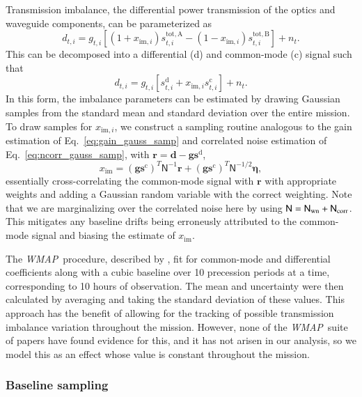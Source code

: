 \documentclass[twocolumn]{../../common/aa}
\def\WMAP{\emph{WMAP}}
\newcommand{\N}[0]{\tens{N}}
\begin{document}
Transmission imbalance, the differential power transmission of the optics and waveguide components, can be parameterized as
\begin{equation}
	d_{t,i}=g_{t,i}[(1+x_{\mathrm{im},i})s_{t,i}^\mathrm{tot,A}-(1-x_{\mathrm{im},i})s_{t,i}^\mathrm{tot,B}]+n_t.
\end{equation}
This can be decomposed into a differential (d) and common-mode (c) signal such that
\begin{equation}
	d_{t,i}=g_{t,i}[s_{t,i}^\mathrm d+x_{\mathrm{im},i}s_{t,i}^\mathrm c]+n_t.
\end{equation}
In this form, the imbalance parameters can be estimated by drawing Gaussian samples from the standard mean and standard deviation over the entire mission. To draw samples for $x_{\mathrm{im},i}$, we construct a sampling routine analogous to the gain estimation of Eq.~\eqref{eq:gain_gauss_samp} and correlated noise estimation of  Eq.~\eqref{eq:ncorr_gauss_samp}, with $\boldsymbol r=\boldsymbol d-\boldsymbol g\boldsymbol s^\mathrm d$,
\begin{equation}
	[(\boldsymbol g\boldsymbol s^\mathrm c)^T\mathsf N^{-1}\boldsymbol g\boldsymbol s^\mathrm c]x_\mathrm{im}
	=(\boldsymbol g\boldsymbol s^\mathrm c)^T\mathsf N^{-1}\boldsymbol r+(\boldsymbol g\boldsymbol s^\mathrm c)^T\mathsf N^{-1/2}\boldsymbol\eta,
\end{equation}
essentially cross-correlating the common-mode signal with $\boldsymbol r$ with appropriate weights and adding a Gaussian random variable with the correct weighting. Note that we are marginalizing over the correlated noise here by using $\N=\N_\mathrm{wn}+\N_\mathrm{corr}$. This mitigates any baseline drifts being erroneusly attributed to the common-mode signal and biasing the estimate of $x_\mathrm{im}$.

The \WMAP\ procedure, described by \citet{jarosik2003a}, fit for common-mode and differential coefficients along with a cubic baseline over 10 precession periods at a time, corresponding to 10 hours of observation. The mean and uncertainty were then calculated by averaging and taking the standard deviation of these values. This approach has the benefit of allowing for the tracking of possible transmission imbalance variation throughout the mission. However, none of the \WMAP\ suite of papers have found evidence for this, and it has not arisen in our analysis, so we model this as an effect whose value is constant throughout the mission.

\subsubsection{Baseline sampling}
\label{ssec:baseline}
\end{document}
